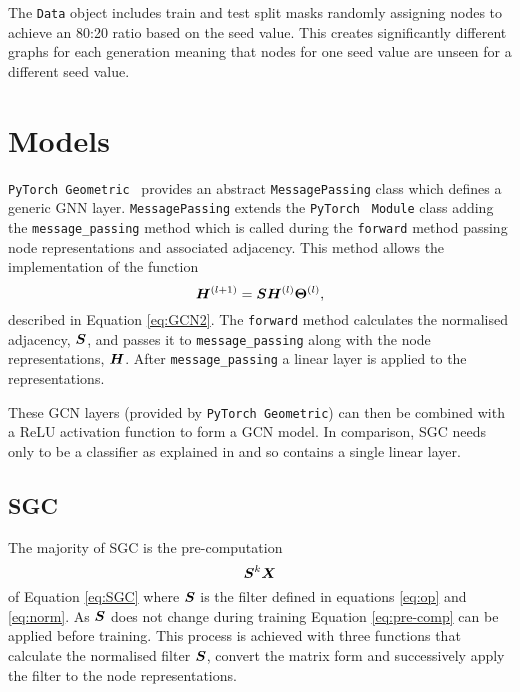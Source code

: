 The \texttt{Data} object includes train and test split masks randomly assigning nodes to achieve an 80:20 ratio based on the seed value.
This creates significantly different graphs for each generation meaning that nodes for one seed value are unseen for a different seed value.

\section{Models}
\label{sec:models}

\texttt{PyTorch Geometric}~\cite{Fey/Lenssen/2019} provides an abstract \texttt{MessagePassing} class which defines a generic GNN layer.
\texttt{MessagePassing} extends the \texttt{PyTorch}~\cite{paszke2019pytorch} \texttt{Module} class adding the \texttt{message\_passing} method which is called during the \texttt{forward} method passing node representations and associated adjacency.
This method allows the implementation of the function
\begin{equation}
    {\bm{H}}^{(l+1)} = {\bm{S}}{\bm{H}}^{(l)}\bm{\Theta}^{(l)},
\end{equation}
described in Equation \ref{eq:GCN2}.
The \texttt{forward} method calculates the normalised adjacency, ${\bm{S}}$, and passes it to \texttt{message\_passing} along with the node representations, ${\bm{H}}$.
After \texttt{message\_passing} a linear layer is applied to the representations.

These GCN layers (provided by \texttt{PyTorch Geometric}) can then be combined with a ReLU activation function to form a GCN model.
In comparison, SGC needs only to be a classifier as explained in  and so contains a single linear layer.

\subsection{SGC}
The majority of SGC is the pre-computation
\begin{equation}
    \label{eq:pre-comp}
    {\bm{S}}^k{\bm{X}}
\end{equation}
of Equation \ref{eq:SGC} where ${\bm{S}}$ is the filter defined in equations \ref{eq:op} and \ref{eq:norm}.
As ${\bm{S}}$ 
does not change during training Equation \ref{eq:pre-comp} can be applied before training.
This process is achieved with three functions that calculate the normalised filter ${\bm{S}}$,
convert the matrix form and successively apply the filter to the node representations.

